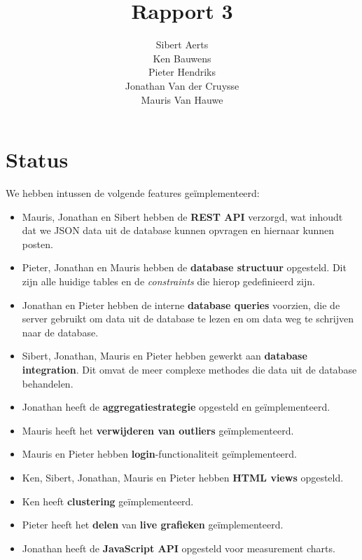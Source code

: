 \documentclass[12pt,parskip=full]{article}
\begin{document}
\title{Rapport 3}
\author{Sibert Aerts \\ Ken Bauwens \\ Pieter Hendriks \\ Jonathan Van der Cruysse \\ Mauris Van Hauwe}
\maketitle

\newcommand{\code}[1]{\texttt{#1}}
%
\newcommand{\CS}{{C\#}}
\lstset{language=[Sharp]C,basicstyle=\ttfamily}

\section{Status}
We hebben intussen de volgende features ge\"implementeerd:

\begin{itemize}
\item Mauris, Jonathan en Sibert hebben de \textbf{REST API} verzorgd, wat
inhoudt dat we JSON data uit de database kunnen opvragen en hiernaar
kunnen posten.

\item Pieter, Jonathan en Mauris hebben de \textbf{database structuur}
opgesteld. Dit zijn alle huidige tables en de \textit{constraints} die hierop gedefinieerd zijn.

\item Jonathan en Pieter hebben de interne \textbf{database queries} voorzien,
die de server gebruikt om data uit de database te lezen en om data weg te
schrijven naar de database.

\item Sibert, Jonathan, Mauris en Pieter hebben gewerkt aan \textbf{database
integration}. Dit omvat de meer complexe methodes die data uit de database
behandelen.

\item Jonathan heeft de \textbf{aggregatiestrategie} opgesteld en ge\"implementeerd.

\item Mauris heeft het \textbf{verwijderen van outliers} ge\"implementeerd.

\item Mauris en Pieter hebben \textbf{login}-functionaliteit ge\"implementeerd.

\item Ken, Sibert, Jonathan, Mauris en Pieter hebben \textbf{HTML views} opgesteld.

\item Ken heeft \textbf{clustering} ge\"implementeerd.

\item Pieter heeft het \textbf{delen} van \textbf{live grafieken} ge\"implementeerd.

\item Jonathan heeft de \textbf{JavaScript API} opgesteld voor measurement charts.

\end{itemize}
\end{document}
